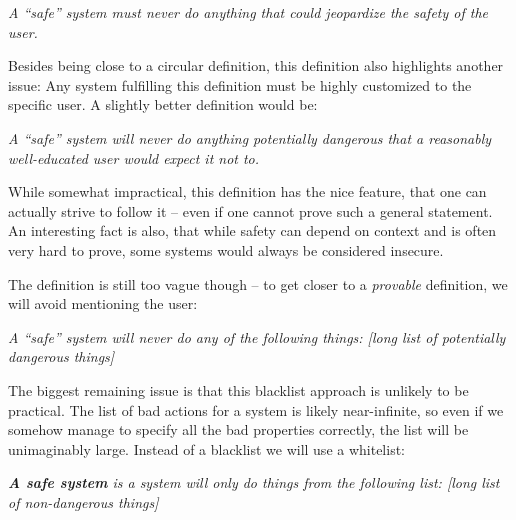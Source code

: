 \vspace{0.3cm}
\begin{addmargin}{1cm}
  {\it A ``safe'' system must never do anything that could jeopardize the
    safety of the user.}
\end{addmargin}
\vspace{0.3cm}

Besides being close to a circular definition, this definition also highlights
another issue: Any system fulfilling this definition must be highly customized
to the specific user. A slightly better definition would be:

\vspace{0.3cm}
\begin{addmargin}{1cm}
  {\it A ``safe'' system will never do anything potentially dangerous that a
    reasonably well-educated user would expect it not to.}
\end{addmargin}
\vspace{0.3cm}

While somewhat impractical, this definition has the nice feature, that one can
actually strive to follow it -- even if one cannot prove such a general
statement. An interesting fact is also, that while safety can depend on context
and is often very hard to prove, some systems would always be considered
insecure.

The definition is still too vague though -- to get closer to a \emph{provable}
definition, we will avoid mentioning the user:

\vspace{0.3cm}
\begin{addmargin}{1cm}
  {\it A ``safe'' system will never do any of the following things: [long list
    of potentially dangerous things]}
\end{addmargin}
\vspace{0.3cm}

The biggest remaining issue is that this blacklist approach is unlikely to be
practical. The list of bad actions for a system is likely near-infinite, so even
if we somehow manage to specify all the bad properties correctly, the list will
be unimaginably large. Instead of a blacklist we will use a whitelist:

\vspace{0.3cm}
\begin{addmargin}{1cm}
  {\it \textbf{A safe system} is a system will only do things from the following
    list: [long list of non-dangerous things]}
\end{addmargin}
\vspace{0.3cm}

